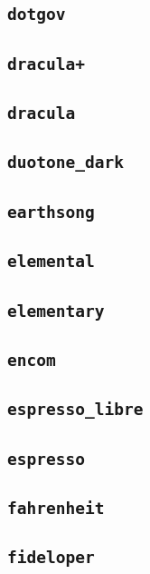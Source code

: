 \subsection{\texttt{dotgov}}
\newpage
\subsection{\texttt{dracula+}}
\newpage
\subsection{\texttt{dracula}}
\newpage
\subsection{\texttt{duotone\_dark}}
\newpage
\subsection{\texttt{earthsong}}
\newpage
\subsection{\texttt{elemental}}
\newpage
\subsection{\texttt{elementary}}
\newpage
\subsection{\texttt{encom}}
\newpage
\subsection{\texttt{espresso\_libre}}
\newpage
\subsection{\texttt{espresso}}
\newpage
\subsection{\texttt{fahrenheit}}
\newpage
\subsection{\texttt{fideloper}}
\newpage
